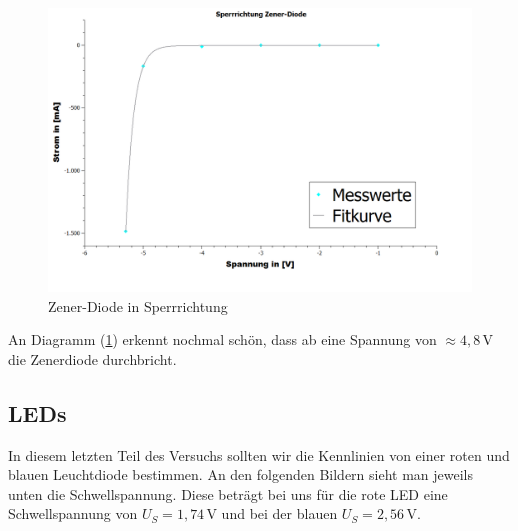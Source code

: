 \documentclass[fontsize=12pt]{scrartcl}
\begin{document}
\noindent
\begin{figure}[H]
\centering
\includegraphics[scale=0.35]{Graphik/Zener_Sperr}
\caption{Zener-Diode in Sperrrichtung}
\label{3}
\end{figure}
\noindent
An Diagramm (\ref{3}) erkennt nochmal schön, dass ab eine Spannung von $\approx 4,8$\,V die Zenerdiode durchbricht.
\newpage

\subsection{LEDs}

In diesem letzten Teil des Versuchs sollten wir die Kennlinien von einer roten und blauen Leuchtdiode bestimmen. An den folgenden Bildern sieht man jeweils unten die Schwellspannung. Diese beträgt bei uns für die rote LED eine Schwellspannung von $U_S=1,74$\,V und bei der blauen $U_S=2,56$\,V.
\end{document}
